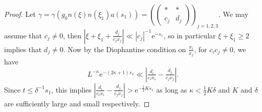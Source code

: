 \documentclass[12pt]{amsart}
\theoremstyle{definition}
\theoremstyle{remark}
\numberwithin{equation}{section}
\newcommand{\e}{\mathrm{e}}
\begin{document}
  \begin{proof}
    Let $\gamma = \gamma(g_0 n(\xi)n(\xi_1)a(s_1))= \left(
    \begin{pmatrix}
      * & * \\
      c_j & d_j 
    \end{pmatrix}
    \right)_{\!\! j=1,2,3}$.
    We may assume that $c_j \neq 0$, then $|\xi + \xi_1 + \frac{d_j}{c_jx_j}| \ll |c_j|^{-1} \e^{-s_1}$, so in particular $\xi + \xi_1 \geq 2$ implies that $d_j \neq 0$.
    Now by the Diophantine condition on $\tfrac{x_i}{x_j}$, for $c_ic_j \neq 0$, we have
    \begin{equation}
      \label{eq:initialexceptional}
      L^{-\kappa} \e^{-(2\kappa + 1)s_1} \ll |\tfrac{d_i}{c_i x_i } - \tfrac{d_j}{c_j x_j}|.
    \end{equation}
    Since $t \leq \delta^{-1} s_1$, this implies $|\tfrac{d_i}{c_i x_i } - \tfrac{d_j}{c_j x_j}| > \e^{-\frac{1}{2} K s_1}$ as long as $\kappa <  \tfrac{1}{2} K \delta$ and $K$ and $\delta$ are sufficiently large and small respectively.
  \end{proof}
    
\end{document}
